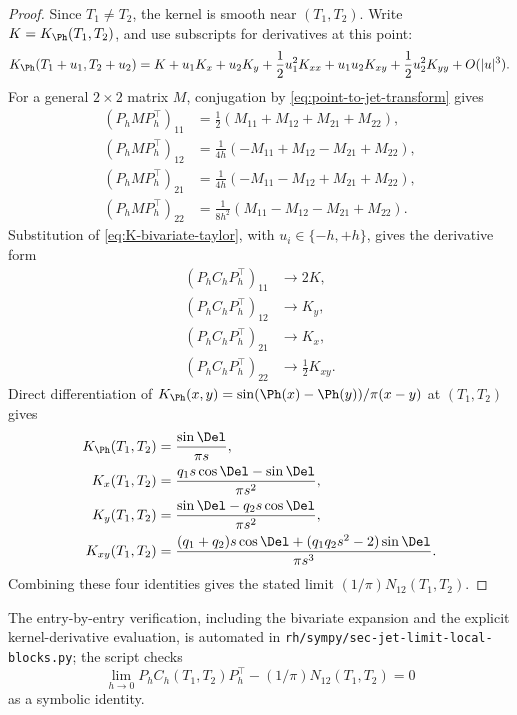 \begin{proof}
Since \(T_1\ne T_2\), the kernel is smooth near \((T_1,T_2)\).  Write
\(K=K_\Ph(T_1,T_2)\), and use subscripts for derivatives at this point:
\begin{equation}
\label{eq:K-bivariate-taylor}
K_\Ph(T_1+u_1,T_2+u_2)
=K+u_1K_x+u_2K_y+\frac12u_1^2K_{xx}+u_1u_2K_{xy}
 +\frac12u_2^2K_{yy}+O(|u|^3).
\end{equation}
For a general \(2\times2\) matrix \(M\), conjugation by
\eqref{eq:point-to-jet-transform} gives
\begin{align*}
(P_hMP_h^\top)_{11}
&=\frac12(M_{11}+M_{12}+M_{21}+M_{22}),\\
(P_hMP_h^\top)_{12}
&=\frac1{4h}(-M_{11}+M_{12}-M_{21}+M_{22}),\\
(P_hMP_h^\top)_{21}
&=\frac1{4h}(-M_{11}-M_{12}+M_{21}+M_{22}),\\
(P_hMP_h^\top)_{22}
&=\frac1{8h^2}(M_{11}-M_{12}-M_{21}+M_{22}).
\end{align*}
Substitution of \eqref{eq:K-bivariate-taylor}, with
\(u_i\in\{-h,+h\}\), gives the derivative form
\begin{align*}
(P_hC_hP_h^\top)_{11}&\longrightarrow 2K,\\
(P_hC_hP_h^\top)_{12}&\longrightarrow K_y,\\
(P_hC_hP_h^\top)_{21}&\longrightarrow K_x,\\
(P_hC_hP_h^\top)_{22}&\longrightarrow \frac12K_{xy}.
\end{align*}
Direct differentiation of
\(K_\Ph(x,y)=\sin(\Ph(x)-\Ph(y))/\pi(x-y)\) at \((T_1,T_2)\) gives
\begin{align*}
K_\Ph(T_1,T_2)&=\frac{\sin\Del}{\pi s},\\
K_x(T_1,T_2)&=\frac{q_1s\cos\Del-\sin\Del}{\pi s^2},\\
K_y(T_1,T_2)&=\frac{\sin\Del-q_2s\cos\Del}{\pi s^2},\\
K_{xy}(T_1,T_2)
&=\frac{(q_1+q_2)s\cos\Del+(q_1q_2s^2-2)\sin\Del}{\pi s^3}.
\end{align*}
Combining these four identities gives the stated limit
\((1/\pi)N_{12}(T_1,T_2)\).
\end{proof}

\begin{remark}
\label{rem:cross-block-jet-limit-sympy}
The entry-by-entry verification, including the bivariate expansion and the
explicit kernel-derivative evaluation, is automated in
\texttt{rh/sympy/sec-jet-limit-local-blocks.py}; the script checks
\[
\lim_{h\to0}P_hC_h(T_1,T_2)P_h^\top-(1/\pi)N_{12}(T_1,T_2)=0
\]
as a symbolic identity.
\end{remark}

